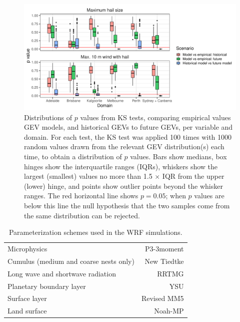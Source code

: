 \documentclass[draft,grl]{agutexSI2019}
\begin{document}
\begin{figure}[!ht]
    \includegraphics[width=\textwidth]{figures/fit_pvals}
    \caption{Distributions of $p$ values from KS tests, comparing empirical values GEV models, and historical GEVs to future GEVs, per variable and domain. For each test, the KS test was applied 100 times with 1000 random values drawn from the relevant GEV distribution(s) each time, to obtain a distribution of $p$ values. Bars show medians, box hinges show the interquartile ranges (IQRs), whiskers show the largest (smallest) values no more than 1.5 $\times$ IQR from the upper (lower) hinge, and points show outlier points beyond the whisker ranges. The red horizontal line shows $p = 0.05$; when $p$ values are below this line the null hypothesis that the two samples come from the same distribution can be rejected.}
    \label{fig:ks_pvals}
\end{figure}

\clearpage

\begin{table}[!ht]
    \caption{Parameterization schemes used in the WRF simulations.}
    \label{tab:schemes}
    \centering
    \begin{tabular}{lr}
          \hline
          Microphysics & P3-3moment \cite{Milbrandt_JAS_2021} \\
          Cumulus (medium and coarse nests only) & New Tiedtke \cite{Zhang_JC_2017} \\
          Long wave and shortwave radiation & RRTMG \cite{Iacono_JGRA_2008} \\
          Planetary boundary layer & YSU \cite{Hong_MWR_2006} \\
          Surface layer & Revised MM5 \cite{Jimenez_MWR_2012} \\
          Land surface & Noah-MP \cite{Niu_JGRA_2011} \\
          \hline
    \end{tabular}
\end{table}
\end{document}
